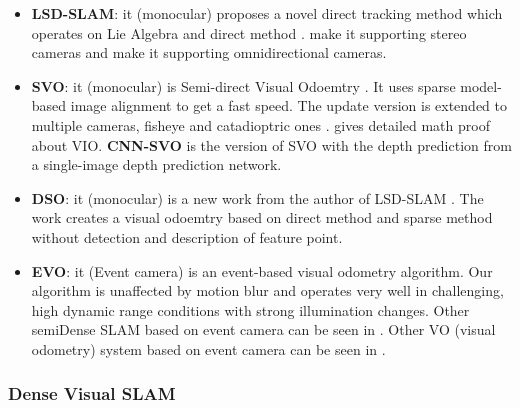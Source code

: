 \documentclass[journal,transmag]{IEEEtran}
\begin{document}
\begin{itemize}
    \item \textbf{LSD-SLAM}:  it (monocular) proposes a novel direct tracking method which operates on Lie Algebra and direct method \cite{engel2014lsd}. \cite{engel2015large} make it supporting stereo cameras and \cite{caruso2015large} make it supporting omnidirectional cameras.
    \item \textbf{SVO}: it (monocular) is Semi-direct Visual Odoemtry \cite{forster2016svo}. It uses sparse model-based image alignment to get a fast speed. The update version is extended to multiple cameras, fisheye and catadioptric ones \cite{forster2016manifold}. \cite{forster2016manifold} gives detailed math proof about VIO. \textbf{CNN-SVO} \cite{loo2018cnn} is the version of  SVO with the depth prediction from a single-image depth prediction network.
    \item \textbf{DSO}:  it (monocular) \cite{DBLP:journals/corr/EngelKC16}\cite{engel2017direct} is a new work from the author of LSD-SLAM \cite{engel2014lsd}. The work creates a visual odoemtry based on direct method and sparse method without detection and description of feature point.
    \item \textbf{EVO}: it (Event camera) \cite{rebecq2016evo} is an event-based visual odometry algorithm. Our algorithm is unaffected by motion blur and operates very well in challenging, high dynamic range conditions with strong illumination changes. Other semiDense SLAM based on event camera can be seen in \cite{zhou2018semi}. Other VO (visual odometry) system based on event camera can be seen in \cite{weikersdorfer2013simultaneous}\cite{weikersdorfer2014event}.

\end{itemize}

\subsubsection{Dense Visual SLAM}
\end{document}
